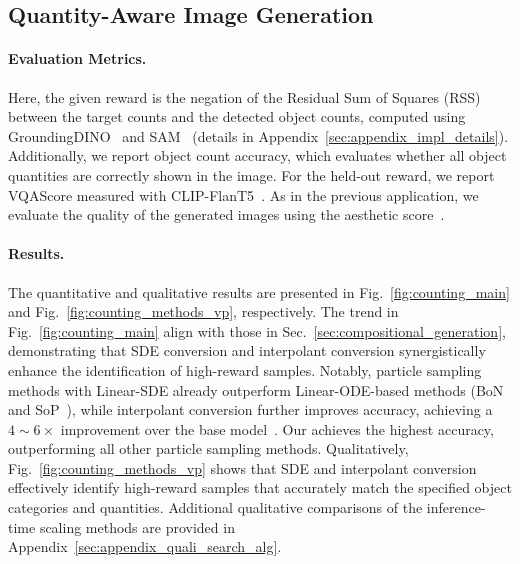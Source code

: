 

% 

\vspace{-0.4\baselineskip}
\subsection{Quantity-Aware Image Generation}
\vspace{-0.3\baselineskip}
\label{sec:counting_generation}
\paragraph{Evaluation Metrics.} 
Here, the given reward is the negation of the Residual Sum of Squares (RSS) between the target counts and the detected object counts, computed using GroundingDINO~\cite{Liu:2024GroundingDINO} and SAM~\cite{Kirillov2023:SAM} (details in Appendix~\ref{sec:appendix_impl_details}). Additionally, we report object count accuracy, which evaluates whether all object quantities are correctly shown in the image. For the held-out reward, we report VQAScore measured with CLIP-FlanT5~\cite{Lin:2024CLIPFlanT5}. 
As in the previous application, we evaluate the quality of the generated images using the aesthetic score~\cite{Schuhmann:aesthetics}. 

\vspace{-0.5\baselineskip}
\paragraph{Results.} The quantitative and qualitative results are presented in Fig.~\ref{fig:counting_main} and Fig.~\ref{fig:counting_methods_vp}, respectively. 
The trend in Fig.~\ref{fig:counting_main} align with those in Sec.~\ref{sec:compositional_generation}, demonstrating that SDE conversion and interpolant conversion synergistically enhance the identification of high-reward samples. 
Notably, particle sampling methods with Linear-SDE already outperform Linear-ODE-based methods (BoN and SoP~\cite{Ma2025:SoP}), while interpolant conversion further improves accuracy, achieving a $4\sim6 \times$ improvement over the base model~\cite{BlackForestLabs:2024Flux}. 
Our \Ours{} achieves the highest accuracy, outperforming all other particle sampling methods. 
Qualitatively, Fig.~\ref{fig:counting_methods_vp} shows that SDE and interpolant conversion effectively identify high-reward samples that accurately match the specified object categories and quantities. Additional qualitative comparisons of the inference-time scaling methods are provided in Appendix~\ref{sec:appendix_quali_search_alg}. 

